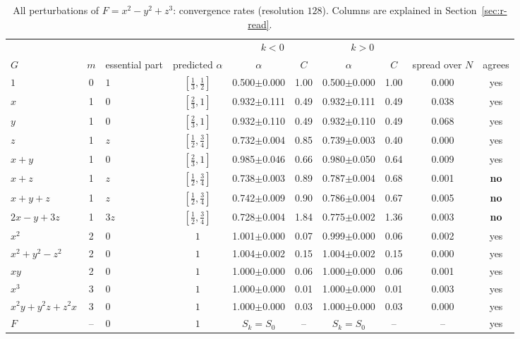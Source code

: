\documentclass[12pt, a4paper]{article}
\theoremstyle{plain}
\theoremstyle{definition}
\theoremstyle{remark}
\theoremstyle{definition}
\begin{document}
\begin{table}[!h]
\centering
\footnotesize
\begin{adjustbox}{max width=\textwidth}
\begin{tabular}{l c l c c c c c c c}
\toprule
& & & & \multicolumn{2}{c}{$k<0$} & \multicolumn{2}{c}{$k>0$} & & \\
\cmidrule(lr){5-6}\cmidrule(lr){7-8}
$G$ & $m$ & essential part & predicted $\alpha$ & $\alpha$ & $C$ & $\alpha$ & $C$ & spread over $N$ & agrees \\
\midrule
$1$ & 0 & $1$ & $[\tfrac13,\tfrac12]$ & 0.500{\scriptsize$\pm$0.000} & 1.00 & 0.500{\scriptsize$\pm$0.000} & 1.00 & 0.000 & yes \\
$x$ & 1 & $0$ & $[\tfrac23,1]$ & 0.932{\scriptsize$\pm$0.111} & 0.49 & 0.932{\scriptsize$\pm$0.111} & 0.49 & 0.038 & yes \\
$y$ & 1 & $0$ & $[\tfrac23,1]$ & 0.932{\scriptsize$\pm$0.110} & 0.49 & 0.932{\scriptsize$\pm$0.110} & 0.49 & 0.068 & yes \\
$z$ & 1 & $z$ & $[\tfrac12,\tfrac34]$ & 0.732{\scriptsize$\pm$0.004} & 0.85 & 0.739{\scriptsize$\pm$0.003} & 0.40 & 0.000 & yes \\
$x+y$ & 1 & $0$ & $[\tfrac23,1]$ & 0.985{\scriptsize$\pm$0.046} & 0.66 & 0.980{\scriptsize$\pm$0.050} & 0.64 & 0.009 & yes \\
$x+z$ & 1 & $z$ & $[\tfrac12,\tfrac34]$ & 0.738{\scriptsize$\pm$0.003} & 0.89 & 0.787{\scriptsize$\pm$0.004} & 0.68 & 0.001 & \textbf{no} \\
$x+y+z$ & 1 & $z$ & $[\tfrac12,\tfrac34]$ & 0.742{\scriptsize$\pm$0.009} & 0.90 & 0.786{\scriptsize$\pm$0.004} & 0.67 & 0.005 & \textbf{no} \\
$2x-y+3z$ & 1 & $3z$ & $[\tfrac12,\tfrac34]$ & 0.728{\scriptsize$\pm$0.004} & 1.84 & 0.775{\scriptsize$\pm$0.002} & 1.36 & 0.003 & \textbf{no} \\
$x^2$ & 2 & $0$ & $1$ & 1.001{\scriptsize$\pm$0.000} & 0.07 & 0.999{\scriptsize$\pm$0.000} & 0.06 & 0.002 & yes \\
$x^2+y^2-z^2$ & 2 & $0$ & $1$ & 1.004{\scriptsize$\pm$0.002} & 0.15 & 1.004{\scriptsize$\pm$0.002} & 0.15 & 0.000 & yes \\
$xy$ & 2 & $0$ & $1$ & 1.000{\scriptsize$\pm$0.000} & 0.06 & 1.000{\scriptsize$\pm$0.000} & 0.06 & 0.001 & yes \\
$x^3$ & 3 & $0$ & $1$ & 1.000{\scriptsize$\pm$0.000} & 0.01 & 1.000{\scriptsize$\pm$0.000} & 0.01 & 0.003 & yes \\
$x^2y+y^2z+z^2x$ & 3 & $0$ & $1$ & 1.000{\scriptsize$\pm$0.000} & 0.03 & 1.000{\scriptsize$\pm$0.000} & 0.03 & 0.000 & yes \\
$F$ & -- & $0$ & $1$ & $S_k=S_0$ & -- & $S_k=S_0$ & -- & -- & yes \\
\bottomrule
\end{tabular}
\end{adjustbox}
\caption[Rates for $x^2-y^2+z^3$]{All perturbations of $F=x^2-y^2+z^3$: convergence rates (resolution $128$). Columns are explained in Section~\ref{sec:r-read}.}
\label{tab:r-A2b-rates}
\end{table}
\end{document}
